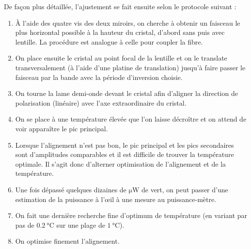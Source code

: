 \documentclass[11pt,a4paper] { article}
\begin{document}
De façon plus détaillée, l'ajustement se fait ensuite selon le protocole suivant :
\begin{enumerate}
	\item À l'aide des quatre vis des deux miroirs, on cherche à obtenir un faisceau le plus horizontal possible à la hauteur du cristal, d'abord sans puis avec lentille. La procédure est analogue à celle pour coupler la fibre.
	\item On place ensuite le cristal au point focal de la lentille et on le translate transversalement (à l'aide d'une platine de translation) jusqu'à faire passer le faisceau par la bande avec la période d'inversion choisie.
	\item On tourne la lame demi-onde devant le cristal afin d'aligner la direction de polarisation (linéaire) avec l'axe extraordinaire du cristal.
	\item On se place à une température élevée que l'on laisse décroître et on attend de voir apparaître le pic principal.
	\item Lorsque l'alignement n'est pas bon, le pic principal et les pics secondaires sont d'amplitudes comparables et il est difficile de trouver la température optimale. Il s'agit donc d'alterner optimisation de l'alignement et de la température.
	\item Une fois dépassé quelques dizaines de $\unit{\micro\watt}$ de vert, on peut passer d'une estimation de la puissance à l'\oe il à une mesure au puissance-mètre.
	\item On fait une dernière recherche fine d'optimum de température (en variant par pas de $\SI{0.2}{\celsius}$ sur une plage de $\SI{1}{\celsius}$).
	\item On optimise finement l'alignement. %
\end{enumerate}





\end{document}
